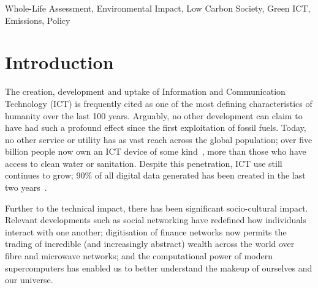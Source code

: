 \documentclass[conference]{IEEEtran}
\begin{document}
%

\begin{IEEEkeywords}
Whole-Life Assessment, Environmental Impact, Low Carbon Society,
Green ICT, Emissions, Policy
\end{IEEEkeywords}


\section{Introduction}

The creation, development and uptake of Information and Communication Technology (ICT) is frequently cited as one
of the most defining characteristics of humanity over the last 100
years. Arguably, no other development can claim to have had such a
profound effect since the first exploitation of fossil fuels. Today, no other service or utility has as vast reach across the global population; over five
billion people now own an ICT device of some
kind~\cite{arup-et-al:2011}, more than those who have access to clean
water or sanitation. Despite this penetration, ICT use still continues
to grow; 90\% of all digital data generated has been created in the
last two years~\cite{bbcnews:2012}.


Further to the technical impact, there has been significant
socio-cultural impact. Relevant developments such as social
networking have redefined how individuals interact with one another;
digitisation of finance networks now permits the trading of incredible
(and increasingly abstract) wealth across the world over fibre and
microwave networks; and the computational power of modern
supercomputers has enabled us to better understand the makeup of
ourselves and our universe.
\end{document}
